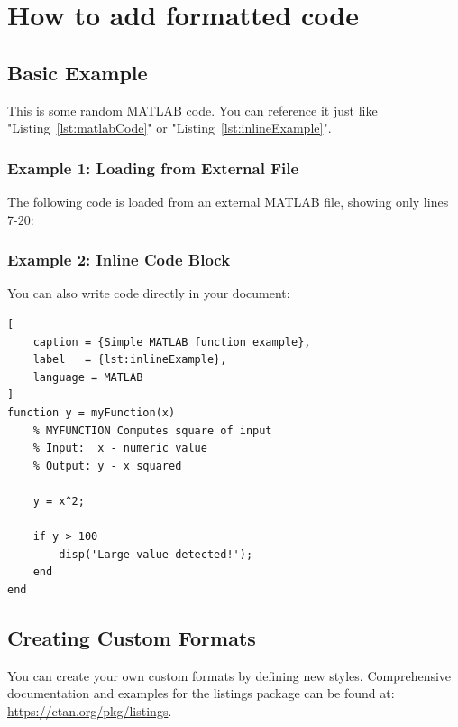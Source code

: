 \chapter{How to add formatted code}

\section{Basic Example}
This is some random MATLAB code. You can reference it just like "Listing~\ref{lst:matlabCode}" 
or "Listing~\ref{lst:inlineExample}".


\subsection*{Example 1: Loading from External File}
The following code is loaded from an external MATLAB file, showing only lines 7-20:



\subsection*{Example 2: Inline Code Block}
You can also write code directly in your document:
\begin{lstlisting}[
    caption = {Simple MATLAB function example},
    label   = {lst:inlineExample},
    language = MATLAB
]
function y = myFunction(x)
    % MYFUNCTION Computes square of input
    % Input:  x - numeric value
    % Output: y - x squared
    
    y = x^2;
    
    if y > 100
        disp('Large value detected!');
    end
end
\end{lstlisting}

\section{Creating Custom Formats}
            
You can create your own custom formats by defining new styles. Comprehensive documentation and examples for the listings package can be found at: \url{https://ctan.org/pkg/listings}.

